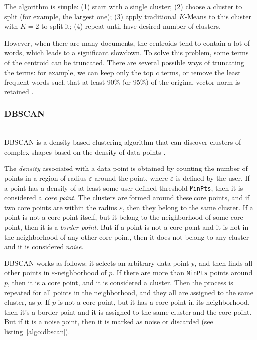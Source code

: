 The algorithm is simple: (1) start with a single cluster;
(2) choose a cluster to split (for example, the largest one);
(3) apply traditional $K$-Means to this cluster with $K=2$ to split it;
(4) repeat until have desired number of clusters.


However, when there are many documents, the centroids tend
to contain a lot of words, which leads to a significant slowdown.
To solve this problem, some terms of the centroid can be truncated.
There are several possible ways of truncating the terms: for example,
we can keep only the top $c$ terms, or remove the least frequent words
such that at least 90\% (or 95\%) of the original vector norm is
retained \cite{schutze1997projections}.


\subsubsection{DBSCAN} \label{sec:dbscan} \ \\

DBSCAN is a density-based clustering algorithm that can discover
clusters of complex shapes based on the density of data points \cite{ester1996density}.

The \emph{density} associated with a data point is obtained by
counting the number of points in a region of radius $\varepsilon$
around the point, where $\varepsilon$  is defined by the user.
If a point has a density of at least some user defined
threshold \verb|MinPts|, then it is considered a \emph{core point}.
The clusters are formed around these core points, and if two core points
are within the radius $\varepsilon$, then they belong to the same cluster.
If a point is not a core point itself, but it belong to the neighborhood of some
core point, then it is a \emph{border point}. But if a point is not a core point
and it is not in the neighborhood of any other core point, then it does not
belong to any cluster and it is considered \emph{noise}.

DBSCAN works as follows: it selects an arbitrary data point $p$, and then
finds all other points in $\varepsilon$-neighborhood of $p$. If
there are more than  \verb|MinPts| points around $p$, then it is a core point,
and it is considered a cluster. Then the process is repeated for all points in
the neighborhood, and they all are assigned to the same cluster, as $p$.
If $p$ is not a core point, but it has a core point in its neighborhood, then
it's a border point and it is assigned to the same cluster and the core point.
But if it is a noise point, then it is marked as noise or discarded
(see listing~\ref{algo:dbscan}).



